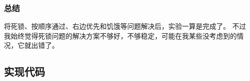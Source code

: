 \documentclass[a4paper,left=2.5cm,right=2.5cm,11pt]{article}
\begin{document}
\subsubsection{总结}
	将死锁、按顺序通过、右边优先和饥饿等问题解决后，实验一算是完成了。
	不过我始终觉得死锁问题的解决方案不够好，不够稳定，可能在我某些没考虑到的情况，它就出错了。

\subsection{实现代码}
	
	
\end{document}
